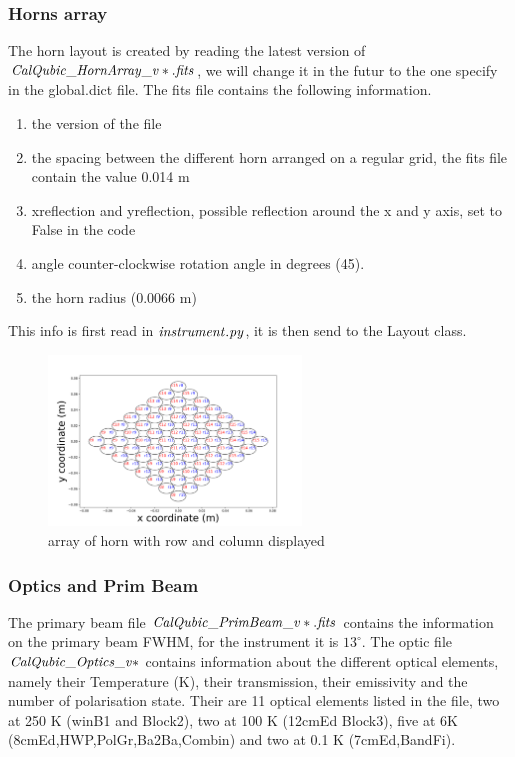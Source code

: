 \documentclass[a4paper, 11pt]{article}
\begin{document}
\subsubsection{ Horns array}

The horn layout is created by reading the latest version of  $\it{CalQubic\_HornArray\_v*.fits}$, we will change it in the futur to the one specify in the global.dict file.
The fits file contains the following information.
\begin{enumerate}
\item the version of the file
\item the spacing between the different horn arranged on a regular grid, the fits file contain the value 0.014 m
\item xreflection and yreflection, possible reflection around the x and y axis, set to False in the code
\item angle counter-clockwise rotation angle in degrees (45).
\item the horn radius (0.0066 m)
\end{enumerate}
This info is first read in $\it{instrument.py}$, it is then send to the Layout class.

\begin{figure}
  \centering
  \includegraphics[width=0.6\textwidth]{hornArray.png}
  \caption{array of horn with row and column displayed}
  \label{fig:horn_array}
\end{figure}

\subsubsection{ Optics and Prim Beam}

The primary beam file $\it{CalQubic\_PrimBeam\_v*.fits}$ contains the information on the primary beam FWHM, for the instrument it is $13^{\circ}$.
The optic file $\it{CalQubic\_Optics\_v*}$ contains information about the different optical elements, namely their Temperature (K), their transmission, their emissivity and the number of polarisation state. Their are 11 optical elements listed in the file, two at 250 K (winB1 and Block2), two at 100 K (12cmEd Block3), five at 6K (8cmEd,HWP,PolGr,Ba2Ba,Combin) and two at 0.1 K (7cmEd,BandFi).
\end{document}
